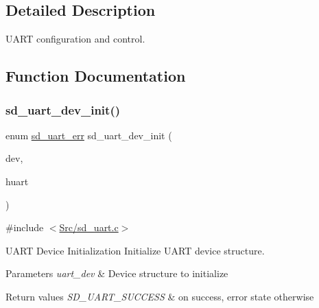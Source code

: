 \subsection{Detailed Description}
U\+A\+RT configuration and control. 



\subsection{Function Documentation}
\mbox{\label{group___s_d___u_a_r_t_ga67a7e880d3ca7aa4f2a2987e3cbd9a15}} 
\subsubsection{\texorpdfstring{sd\+\_\+uart\+\_\+dev\+\_\+init()}{sd\_uart\_dev\_init()}}
{\footnotesize\ttfamily enum \mbox{\hyperlink{group___s_d___u_a_r_t___types_gaff649a266fb34035c10733370c4fd104}{sd\+\_\+uart\+\_\+err}} sd\+\_\+uart\+\_\+dev\+\_\+init (\begin{DoxyParamCaption}\item[{struct \mbox{\hyperlink{structsd__uart__dev}{sd\+\_\+uart\+\_\+dev}} $\ast$}]{dev,  }\item[{U\+A\+R\+T\+\_\+\+Handle\+Type\+Def $\ast$}]{huart }\end{DoxyParamCaption})\hspace{0.3cm}{\ttfamily [static]}}



{\ttfamily \#include $<$\mbox{\hyperlink{sd__uart_8c}{Src/sd\+\_\+uart.\+c}}$>$}



U\+A\+RT Device Initialization Initialize U\+A\+RT device structure. 


\begin{DoxyParams}{Parameters}
{\em uart\+\_\+dev} & Device structure to initialize \\
\hline
\end{DoxyParams}

\begin{DoxyRetVals}{Return values}
{\em S\+D\+\_\+\+U\+A\+R\+T\+\_\+\+S\+U\+C\+C\+E\+SS} & on success, error state otherwise \\
\hline
\end{DoxyRetVals}

